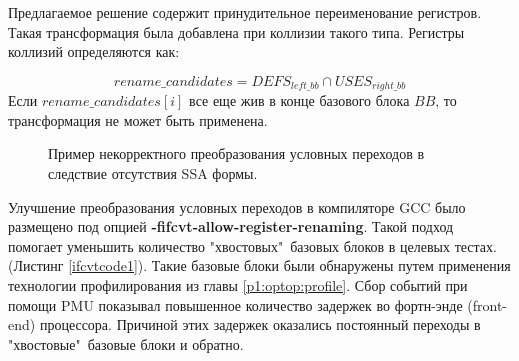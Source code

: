 Предлагаемое решение содержит принудительное переименование регистров. Такая трансформация была добавлена при коллизии такого типа. Регистры коллизий определяются как:

$$rename\_candidates = DEFS_{left\_bb} \cap USES_{right\_bb} $$
Если $rename\_candidates[i]$ все еще жив в конце базового блока $BB$, то трансформация не может быть применена.


\begin{figure}[htbp]
	\centering

	
	\caption{Пример некорректного преобразования условных переходов в следствие отсутствия SSA формы.}
	\label{fig:ifcvtsvg1}
\end{figure}

Улучшение преобразования условных переходов в компиляторе GCC было размещено под опцией \mbox{\textbf{-fifcvt-allow-register-renaming}}. Такой подход помогает уменьшить количество "хвостовых"\   базовых блоков в целевых тестах. (Листинг \ref{ifcvtcode1}). Такие базовые блоки были обнаружены путем применения технологии профилирования из главы \ref{p1:optop:profile}. Сбор событий при помощи PMU показывал повышенное количество задержек во фортн-энде (front-end) процессора. Причиной этих задержек оказались постоянный переходы в "хвостовые"\   базовые блоки и обратно.


\begin{ListingEnv}[!h]
	\captiondelim{ } %
		\caption{Пример "хвостовых"\  базовых блоков, которые будут оптимизированы предложенным улучшением преобразования условных переходов.}
	\label{ifcvtcode1}
\end{ListingEnv}

